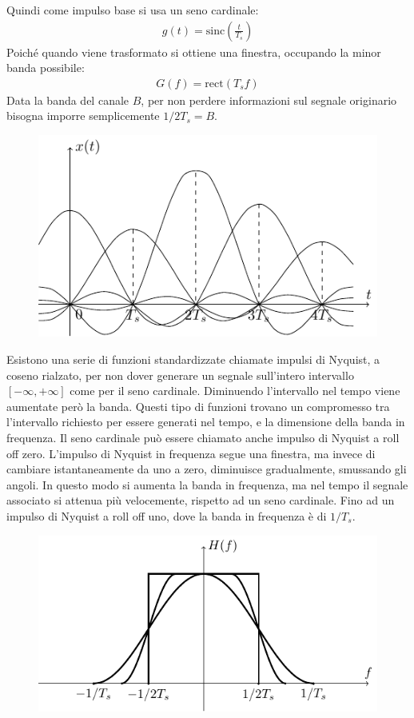 \documentclass{article}
\newcommand{\rect}{\mathrm{rect}}
\newcommand{\sinc}{\mathrm{sinc}}
\numberwithin{equation}{subsection}
\begin{document}
Quindi come impulso base si usa un seno cardinale:
\begin{gather*}
    g(t)=\sinc\displaystyle\left(\frac{t}{T_s}\right)
\end{gather*}
Poiché quando viene trasformato si ottiene una finestra, occupando la minor banda possibile:
\begin{gather*}
    G(f)=\rect(T_sf)
\end{gather*}
Data la banda del canale $B$, per non perdere informazioni sul segnale originario bisogna imporre semplicemente $1/2T_s=B$. 
\begin{figure}[H]%
    \centering
    \includegraphics{impulso-sinc.pdf}%
\end{figure}
Esistono una serie di funzioni standardizzate chiamate impulsi di Nyquist, a coseno rialzato, per non dover generare un segnale sull'intero intervallo $[-\infty,+\infty]$ come 
per il seno cardinale. Diminuendo l'intervallo nel tempo viene aumentate però la banda. Questi tipo di funzioni trovano un compromesso tra l'intervallo richiesto per 
essere generati nel tempo, e la dimensione della banda in frequenza. Il seno cardinale può essere chiamato anche impulso di Nyquist a roll off zero. 
L'impulso di Nyquist in frequenza segue una finestra, ma invece di cambiare istantaneamente da uno a zero, diminuisce gradualmente, smussando gli angoli. In questo 
modo si aumenta la banda in frequenza, ma nel tempo il segnale associato si attenua più velocemente, rispetto ad un seno cardinale. 
Fino ad un impulso di Nyquist a roll off uno, dove la banda in frequenza è di $1/T_s$. %
\begin{figure}[H]%
    \centering
    \includegraphics{impulso-nyquist.pdf}
\end{figure}
\end{document}
